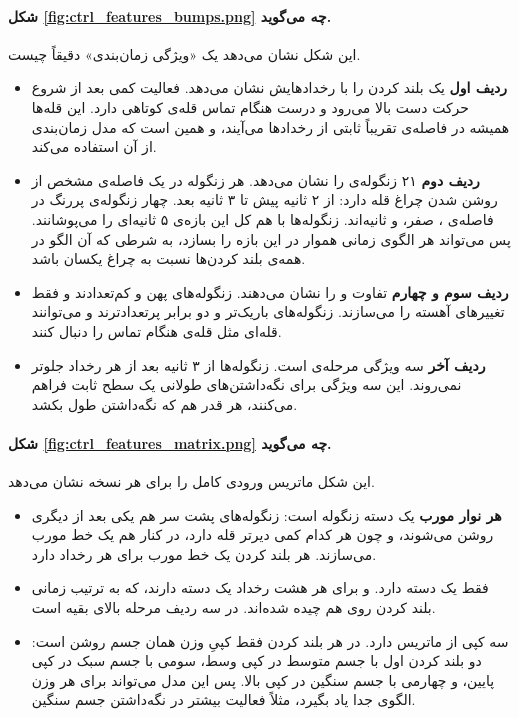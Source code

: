 \paragraph{شکل \ref{fig:ctrl_features_bumps.png} چه می‌گوید.} این شکل نشان می‌دهد یک «ویژگی زمان‌بندی» دقیقاً چیست.
\begin{itemize}
\item \textbf{ردیف اول} یک بلند کردن را با رخدادهایش نشان می‌دهد. فعالیت  کمی بعد از شروع حرکت دست بالا می‌رود و  درست هنگام تماس قله‌ی کوتاهی دارد. این قله‌ها همیشه در فاصله‌ی تقریباً ثابتی از رخدادها می‌آیند، و همین است که مدل زمان‌بندی از آن استفاده می‌کند.
\item \textbf{ردیف دوم} ۲۱ زنگوله‌ی  را نشان می‌دهد. هر زنگوله در یک فاصله‌ی مشخص از روشن شدن چراغ قله دارد: از ۲ ثانیه پیش تا ۳ ثانیه بعد. چهار زنگوله‌ی پررنگ در فاصله‌ی ، صفر،  و  ثانیه‌اند. زنگوله‌ها با هم کل این بازه‌ی ۵ ثانیه‌ای را می‌پوشانند. پس  می‌تواند هر الگوی زمانی هموار در این بازه را بسازد، به شرطی که آن الگو در همه‌ی بلند کردن‌ها نسبت به چراغ یکسان باشد.
\item \textbf{ردیف سوم و چهارم} تفاوت  و  را نشان می‌دهند. زنگوله‌های  پهن و کم‌تعدادند و فقط تغییرهای آهسته را می‌سازند. زنگوله‌های  باریک‌تر و دو برابر پرتعدادترند و می‌توانند قله‌ای مثل قله‌ی  هنگام تماس را دنبال کنند.
\item \textbf{ردیف آخر} سه ویژگی مرحله‌ی  است. زنگوله‌ها از ۳ ثانیه بعد از هر رخداد جلوتر نمی‌روند. این سه ویژگی برای نگه‌داشتن‌های طولانی یک سطح ثابت فراهم می‌کنند، هر قدر هم که نگه‌داشتن طول بکشد.
\end{itemize}


\paragraph{شکل \ref{fig:ctrl_features_matrix.png} چه می‌گوید.} این شکل ماتریس ورودی کامل  را برای هر نسخه نشان می‌دهد.
\begin{itemize}
\item \textbf{هر نوار مورب} یک دسته زنگوله است: زنگوله‌های پشت سر هم یکی بعد از دیگری روشن می‌شوند، و چون هر کدام کمی دیرتر قله دارد، در کنار هم یک خط مورب می‌سازند. هر بلند کردن یک خط مورب برای هر رخداد دارد.
\item \textbf{} فقط یک دسته دارد.  و  برای هر هشت رخداد یک دسته دارند، که به ترتیب زمانی بلند کردن روی هم چیده شده‌اند. در  سه ردیف مرحله بالای بقیه است.
\item \textbf{} سه کپی از ماتریس  دارد. در هر بلند کردن فقط کپیِ وزن همان جسم روشن است: دو بلند کردن اول با جسم متوسط در کپی وسط، سومی با جسم سبک در کپی پایین، و چهارمی با جسم سنگین در کپی بالا. پس این مدل می‌تواند برای هر وزن الگوی جدا یاد بگیرد، مثلاً فعالیت بیشتر در نگه‌داشتن جسم سنگین.
\end{itemize}

